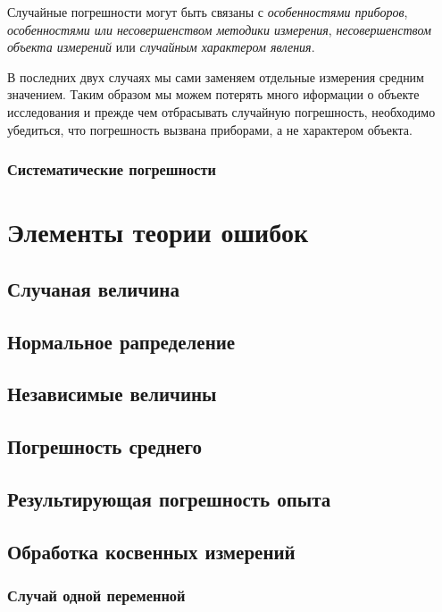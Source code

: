 \documentclass[12pt]{article}
\begin{document}
        Случайные погрешности могут быть связаны с \textit{особенностями приборов},
        \textit{особенностями или несовершенством методики измерения},
        \textit{несовершенством объекта измерений} или \textit{случайным характером явления}.

        В последних двух случаях мы сами заменяем отдельные измерения средним значением.
        Таким образом мы можем потерять много иформации о объекте исследования и
        прежде чем отбрасывать случайную погрешность, необходимо убедиться, что
        погрешность вызвана приборами, а не характером объекта.

      \subsubsection{Систематические погрешности}

  \section{Элементы теории ошибок}

    \subsection{Случаная величина}

    \subsection{Нормальное рапределение}

    \subsection{Независимые величины}

    \subsection{Погрешность среднего}

    \subsection{Результирующая погрешность опыта}

    \subsection{Обработка косвенных измерений}

      \subsubsection{Случай одной переменной}
\end{document}
